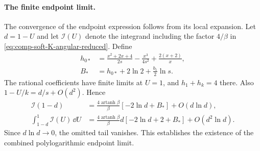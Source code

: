 

\paragraph{The finite endpoint limit.} The convergence of the endpoint
expression follows from its local expansion.
Let $d=1-U$ and let $\mathcal I(U)$ denote the integrand including the
factor $4/\beta$ in \eqref{eq:comp-soft-K-angular-reduced}. Define
\begin{align}
 h_{0*}&=\frac{x^2+2x+4}{2s}-\frac{x^3}{4s^2}+\frac{2(x+2)}x,\\
 B_*&=h_{0*}+2\ln2+\frac{b_1}2\ln s.
\end{align}
The rational coefficients have finite limits at $U=1$, and
$h_1+h_k=4$ there. Also $1-U/k=d/s+O(d^2)$. Hence
\begin{align}
 \mathcal I(1-d)&=\frac{4\operatorname{artanh}\beta}{\beta}
 [-2\ln d+B_*]+O(d\ln d),\\
 \int_{1-d}^1\mathcal I(U)\,\dd U
 &=\frac{4\operatorname{artanh}\beta}{\beta}
 d[-2\ln d+2+B_*]+O(d^2\ln d).
\end{align}
Since $d\ln d\to0$, the omitted tail vanishes. This establishes the
existence of the combined polylogarithmic endpoint limit.

